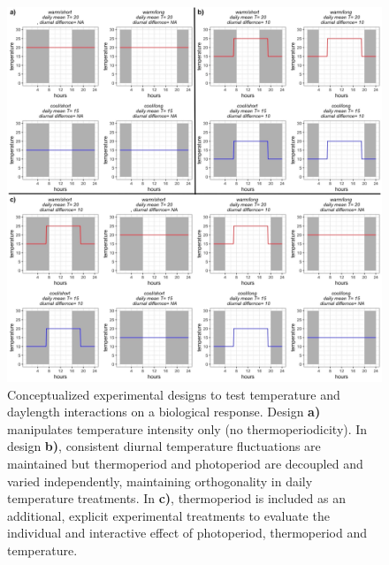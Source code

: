\documentclass[11pt]{article}
\begin{document}
\begin{figure}[h!]
    \centering
 \includegraphics[width=\textwidth]{..//Plots/periodicity_figures/designs.jpeg}
    \caption{Conceptualized experimental designs to test temperature and daylength interactions on a biological response. Design \textbf{a)}  manipulates temperature intensity only (no thermoperiodicity). In design \textbf{b)}, consistent diurnal temperature fluctuations are maintained but thermoperiod and photoperiod are decoupled and varied independently, maintaining orthogonality in daily temperature treatments. In \textbf{c)}, thermoperiod is included as an additional, explicit experimental treatments to evaluate the individual and interactive effect of photoperiod, thermoperiod and temperature.}
    \label{fig:designs}
\end{figure}
 
\end{document}
